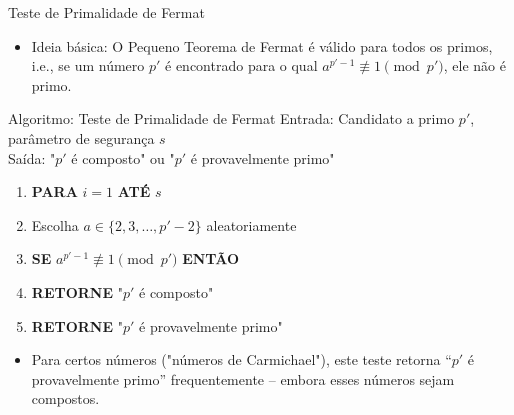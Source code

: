 \documentclass{beamer}
\begin{document}
\begin{frame}{Teste de Primalidade de Fermat}

\begin{itemize}
    \item Ideia básica: O Pequeno Teorema de Fermat é válido para todos os primos, i.e., se um número $p'$ é encontrado para o qual $a^{p'-1} \not\equiv 1 \pmod{p'}$, ele não é primo.
\end{itemize}

\begin{block}{Algoritmo: Teste de Primalidade de Fermat}
\tiny
    Entrada: Candidato a primo $p'$, parâmetro de segurança $s$ \\
    Saída: "$p'$ é composto" ou "$p'$ é provavelmente primo"
    
    \vspace{0.2cm} 
    
    \begin{enumerate}[1.]
        \item \textbf{PARA} $i=1$ \textbf{ATÉ} $s$
        \item \hspace{0.5cm} Escolha $a \in \{2, 3, \dots, p'-2\}$ aleatoriamente
        \item \hspace{0.5cm} \textbf{SE} $a^{p'-1} \not\equiv 1 \pmod{p'}$ \textbf{ENTÃO}
        \item \hspace{1cm} \textbf{RETORNE} "$p'$ é composto"
        \item \textbf{RETORNE} "$p'$ é provavelmente primo"
    \end{enumerate}
\end{block}

\begin{itemize}
    \item Para certos números ("números de Carmichael"), este teste retorna ``$p'$ é provavelmente primo'' frequentemente – embora esses números sejam compostos.
\end{itemize}

\end{frame}
\end{document}
